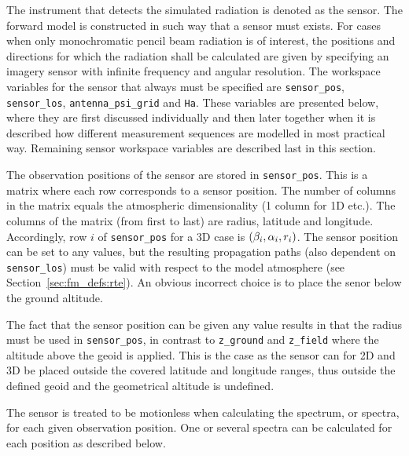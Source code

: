 The instrument that detects the simulated radiation is denoted as the
sensor. The forward model is constructed in such
way that a sensor must exists. For cases when only monochromatic
pencil beam radiation is of interest, the positions and directions for
which the radiation shall be calculated are given by specifying an
imagery sensor with infinite frequency and angular resolution. The
workspace variables for the sensor that always must be specified are
\verb|sensor_pos|, \verb|sensor_los|, \verb|antenna_psi_grid| and
\verb|Ha|. These variables are presented below, where they are first
discussed individually and then later together when it is described
how different measurement sequences are modelled in most practical
way. Remaining sensor workspace variables are described last in this
section.


\label{sec:fm_defs:sensorpos}

The observation positions of the sensor are stored in
\verb|sensor_pos|. This is a matrix where each row corresponds to a
sensor position. The number of columns in the matrix equals the
atmospheric dimensionality (1 column for 1D etc.). The columns of the
matrix (from first to last) are radius, latitude and longitude.
Accordingly, row $i$ of \verb|sensor_pos| for a 3D case is
$(\beta_{i},\alpha_{i},r_{i})$. The sensor position can be set to any
values, but the resulting propagation paths (also dependent on
\verb|sensor_los|) must be valid with respect to the model atmosphere
(see Section~\ref{sec:fm_defs:rte}). An obvious incorrect choice is to
place the senor below the ground altitude.

The fact that the sensor position can be given any value results in
that the radius must be used in \verb|sensor_pos|, in contrast to
\verb|z_ground| and \verb|z_field| where the altitude above the geoid
is applied. This is the case as the sensor can for 2D and 3D be
placed outside the covered latitude and longitude ranges, thus
outside the defined geoid and the geometrical altitude is undefined.

The sensor is treated to be motionless when calculating the spectrum,
or spectra, for each given observation position. One or several
spectra can be calculated for each position as described below.


\label{sec:fm_defs:los}

